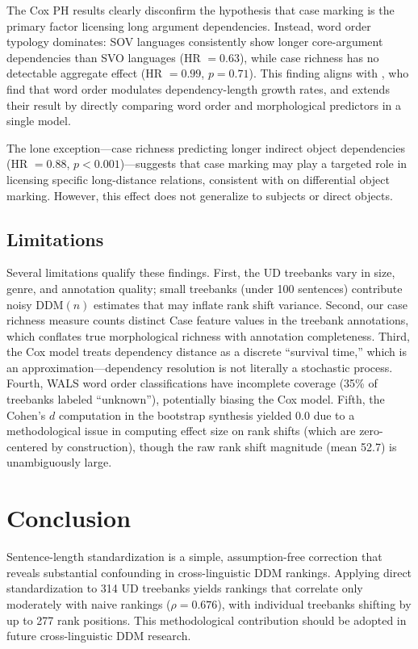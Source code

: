 \documentclass[11pt,letterpaper]{article}
\begin{document}
The Cox PH results clearly disconfirm the hypothesis that case marking is the primary factor licensing long argument dependencies. Instead, word order typology dominates: SOV languages consistently show longer core-argument dependencies than SVO languages (HR $= 0.63$), while case richness has no detectable aggregate effect (HR $= 0.99$, $p = 0.71$). This finding aligns with \citet{Park2022}, who find that word order modulates dependency-length growth rates, and extends their result by directly comparing word order and morphological predictors in a single model.

The lone exception---case richness predicting longer indirect object dependencies (HR $= 0.88$, $p < 0.001$)---suggests that case marking may play a targeted role in licensing specific long-distance relations, consistent with \citet{Holmes2024} on differential object marking. However, this effect does not generalize to subjects or direct objects.

\subsection{Limitations}

Several limitations qualify these findings. First, the UD treebanks vary in size, genre, and annotation quality; small treebanks (under 100 sentences) contribute noisy $\text{DDM}(n)$ estimates that may inflate rank shift variance. Second, our case richness measure counts distinct Case feature values in the treebank annotations, which conflates true morphological richness with annotation completeness. Third, the Cox model treats dependency distance as a discrete ``survival time,'' which is an approximation---dependency resolution is not literally a stochastic process. Fourth, WALS word order classifications have incomplete coverage (35\% of treebanks labeled ``unknown''), potentially biasing the Cox model. Fifth, the Cohen's $d$ computation in the bootstrap synthesis yielded 0.0 due to a methodological issue in computing effect size on rank shifts (which are zero-centered by construction), though the raw rank shift magnitude (mean 52.7) is unambiguously large.

\section{Conclusion}

Sentence-length standardization is a simple, assumption-free correction that reveals substantial confounding in cross-linguistic DDM rankings. Applying direct standardization to 314 UD treebanks yields rankings that correlate only moderately with naive rankings ($\rho = 0.676$), with individual treebanks shifting by up to 277 rank positions. This methodological contribution should be adopted in future cross-linguistic DDM research.
\end{document}
